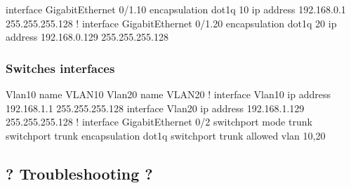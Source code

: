 \begin{txt}
    interface GigabitEthernet 0/1.10
    encapsulation dot1q 10
    ip address 192.168.0.1 255.255.255.128
    !
    interface GigabitEthernet 0/1.20
    encapsulation dot1q 20
    ip address 192.168.0.129 255.255.255.128
\end{txt}

\subsubsection{Switches interfaces}

\begin{txt}
    Vlan10
    name VLAN10
    Vlan20
    name VLAN20
    !
    interface Vlan10
    ip address 192.168.1.1 255.255.255.128
    interface Vlan20
    ip address 192.168.1.129 255.255.255.128
    !
    interface GigabitEthernet 0/2
    switchport mode trunk
    switchport trunk encapsulation dot1q
    switchport trunk allowed vlan 10,20
\end{txt}

\pagebreak


\pagebreak

\subsection{? Troubleshooting ?}

